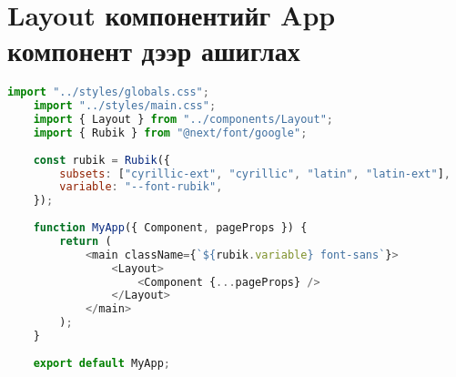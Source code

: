 \chapter{Layout компонентийг App компонент дээр ашиглах}
\label{appendix:layout-component}

\begin{lstlisting}[language=Javascript, frame=single]
	import "../styles/globals.css";
	import "../styles/main.css";
	import { Layout } from "../components/Layout";
	import { Rubik } from "@next/font/google";
	
	const rubik = Rubik({
		subsets: ["cyrillic-ext", "cyrillic", "latin", "latin-ext"],
		variable: "--font-rubik",
	});
	
	function MyApp({ Component, pageProps }) {
		return (
			<main className={`${rubik.variable} font-sans`}>
				<Layout>
					<Component {...pageProps} />
				</Layout>
			</main>
		);
	}
	
	export default MyApp;
	
\end{lstlisting}

% 